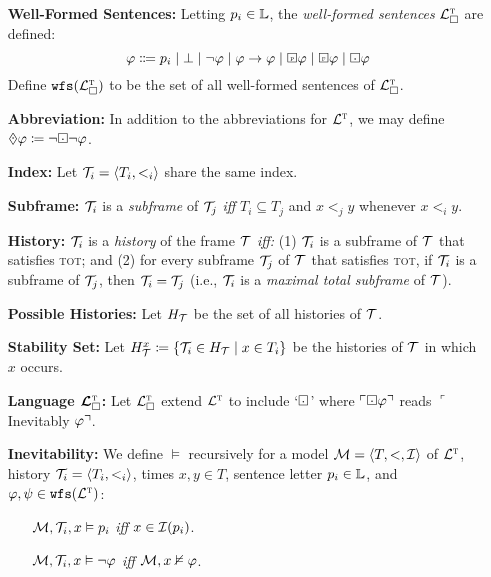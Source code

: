 \documentclass[a4paper, 11pt]{article} %
\begin{document}
\begin{enumerate}[leftmargin=1.2in]
	\item[\bf Well-Formed Sentences:] Letting $p_i \in \mathbb{L}$, the \textit{well-formed sentences} $\mathcal{L}^{\textsc{t}}_\square$ are defined:
    \[ \metaA \Coloneq p_i \mid 
      \bot \mid 
      \neg\metaA \mid 
      \metaA \rightarrow \metaA \mid 
      \Past\metaA \mid 
      \Future\metaA \mid
      \Inevitably\metaA
    \]
    Define $\texttt{wfs}(\mathcal{L}^{\textsc{t}}_\square)$ to be the set of all well-formed sentences of $\mathcal{L}^{\textsc{t}}_\square$.
  \item[\bf Abbreviation:] In addition to the abbreviations for $\mathcal{L}^{\textsc{t}}$, we may define $\inevitably\metaA \coloneq \neg\Inevitably\neg \metaA$.
  \item[\bf Index:] Let $\mathcal{T}_i = \langle T_i, <_i\rangle$ share the same index. 
  \item[\bf Subframe:] $\mathcal{T}_i$ is a \textit{subframe} of $\mathcal{T}_j$ \textit{iff} $T_i \subseteq T_j$ and $x <_j y$ whenever $x <_i y$. 
  \item[\bf History:] $\mathcal{T}_i$ is a \textit{history} of the frame $\mathcal{T}$ \textit{iff:} (1) $\mathcal{T}_i$ is a subframe of $\mathcal{T}$ that satisfies \textsc{tot}; and (2) for every subframe $\mathcal{T}_j$ of $\mathcal{T}$ that satisfies \textsc{tot}, if $\mathcal{T}_i$ is a subframe of $\mathcal{T}_j$, then $\mathcal{T}_i = \mathcal{T}_j$ (i.e., $\mathcal{T}_i$ is a \textit{maximal total subframe} of $\mathcal{T}$).
  \item[\bf Possible Histories:] Let $H_{\mathcal{T}}$ be the set of all histories of $\mathcal{T}$.
  \item[\bf Stability Set:] Let $H_{\mathcal{T}}^x \coloneq \lbrace\mathcal{T}_i \in H_{\mathcal{T}} \mid x \in T_i\rbrace$ be the histories of $\mathcal{T}$ in which $x$ occurs.
  \item[\bf Language $\boldsymbol{\mathcal{L}^{\textsc{t}}_\square}$:] Let $\mathcal{L}^{\textsc{t}}_\square$ extend $\mathcal{L}^{\textsc{t}}$ to include `$\Inevitably$' where $\corner{\Inevitably\metaA}$ reads $\ulcorner$Inevitably $\varphi\urcorner$.
  \item[\bf Inevitability:] We define $\vDash$ recursively for a model $\mathcal{M} = \langle T, <, \mathcal{I}\rangle$ of $\mathcal{L}^{\textsc{t}}$, history $\mathcal{T}_i = \langle T_i, <_i\rangle$, times $x, y \in T$, sentence letter $p_i \in \mathbb{L}$, and $\varphi, \psi \in \texttt{wfs}(\mathcal{L}^{\textsc{t}})$:
    \begin{itemize}[leftmargin=.15in]\small
      \item[] $\mathcal{M}, \mathcal{T}_i, x \vDash p_i$ \textit{iff} $x \in \mathcal{I}(p_i)$.
      \item[] $\mathcal{M}, \mathcal{T}_i, x \vDash \neg \varphi$ \textit{iff} $\mathcal{M}, x\nvDash \varphi$.

\end{itemize}
\end{enumerate}
\end{document}
